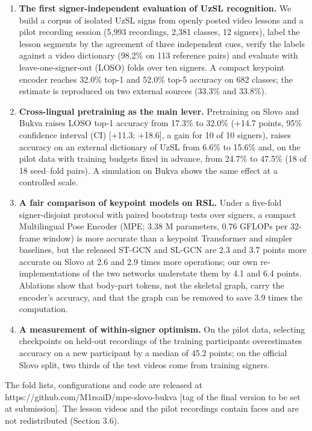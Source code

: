 \documentclass[a4paper,fleqn]{cas-dc}
\providecommand{\tightlist}{\setlength{\itemsep}{0pt}\setlength{\parskip}{0pt}}
\begin{document}
\begin{enumerate}
\def\labelenumi{\arabic{enumi}.}
\tightlist
\item
  \textbf{The first signer-independent evaluation of UzSL recognition.} We build a corpus of isolated UzSL signs from openly posted video lessons and a pilot recording session (5,993 recordings, 2,381 classes, 12 signers), label the lesson segments by the agreement of three independent cues, verify the labels against a video dictionary (98.2\% on 113 reference pairs) and evaluate with leave-one-signer-out (LOSO) folds over ten signers. A compact keypoint encoder reaches 32.0\% top-1 and 52.0\% top-5 accuracy on 682 classes; the estimate is reproduced on two external sources (33.3\% and 33.8\%).
\item
  \textbf{Cross-lingual pretraining as the main lever.} Pretraining on Slovo and Bukva raises LOSO top-1 accuracy from 17.3\% to 32.0\% (+14.7 points, 95\% confidence interval (CI) {[}+11.3; +18.6{]}, a gain for 10 of 10 signers), raises accuracy on an external dictionary of UzSL from 6.6\% to 15.6\% and, on the pilot data with training budgets fixed in advance, from 24.7\% to 47.5\% (18 of 18 seed--fold pairs). A simulation on Bukva shows the same effect at a controlled scale.
\item
  \textbf{A fair comparison of keypoint models on RSL.} Under a five-fold signer-disjoint protocol with paired bootstrap tests over signers, a compact Multilingual Pose Encoder (MPE; 3.38 M parameters, 0.76 GFLOPs per 32-frame window) is more accurate than a keypoint Transformer and simpler baselines, but the released ST-GCN \cite{2018_yan_stgcn} and SL-GCN \cite{2021_jiang_sam_slr} are 2.3 and 3.7 points more accurate on Slovo at 2.6 and 2.9 times more operations; our own re-implementations of the two networks understate them by 4.1 and 6.4 points. Ablations show that body-part tokens, not the skeletal graph, carry the encoder's accuracy, and that the graph can be removed to save 3.9 times the computation.
\item
  \textbf{A measurement of within-signer optimism.} On the pilot data, selecting checkpoints on held-out recordings of the training participants overestimates accuracy on a new participant by a median of 45.2 points; on the official Slovo split, two thirds of the test videos come from training signers.
\end{enumerate}

The fold lists, configurations and code are released at https://github.com/M1rsaiD/mpe-slovo-bukva {\color{red}[tag of the final version to be set at submission]}. The lesson videos and the pilot recordings contain faces and are not redistributed (Section 3.6).
\end{document}
